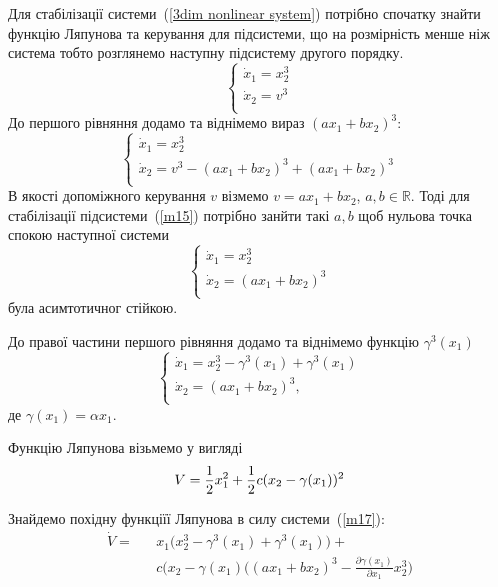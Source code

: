 \documentclass{article}
\begin{document}
Для стабілізації системи~(\ref{3dim nonlinear system}) потрібно спочатку знайти функцію Ляпунова
та керування для підсистеми, що на розмірність менше ніж система  тобто розглянемо 
наступну підсистему другого порядку. 
\begin{equation} \label{2dim nonlinear system}
    \begin{cases}
    \dot x_1 = x_2^3\\
    \dot x_2 = v^3\\
    \end{cases}
\end{equation}
До першого рівняння додамо та віднімемо вираз $(ax_1+bx_2)^3$:
\begin{equation}\label{m15}
    \begin{cases}
    \dot x_1 = x_{2}^3 \\
    \dot x_2 = v^3 - (ax_1+bx_2)^3 +(ax_1+bx_2)^3 \\
    \end{cases}
\end{equation}
В якості допоміжного керування $v$ візмемо $v=ax_1+bx_2$, $a,b \in \mathbb{R}$. Тоді
для стабілізації підсистеми~(\ref{m15}) потрібно занйти такі  $a,b$ щоб нульова точка спокою 
наступної системи
\begin{equation}\label{2dim nonlinear system2}
    \begin{cases}
    \dot x_1 =x_{2}^3 \\
    \dot x_2 =(ax_1+bx_2)^3 \\
    \end{cases}
\end{equation}
була асимтотичног стійкою.


До правої частини першого рівняння додамо та віднімемо функцію $\gamma^3(x_1)$ 
\begin{equation} \label{m17}
    \begin{cases}
    \dot x_1 =x_{2}^3 -\gamma^3(x_1)+\gamma^3(x_1) \\
    \dot x_2 = (ax_1+bx_2)^3,\\
    \end{cases}
\end{equation}
де $\gamma(x_1) = \alpha x_1$.

Функцію Ляпунова візьмемо у вигляді  
\begin{equation}
    V = \frac{1}{2}x_{1}^2 +\frac{1}{2}c(x_2 - \gamma(x_1) )^2\\
\end{equation}

Знайдемо похідну функціїї Ляпунова в силу системи~(\ref{m17}):
\begin{eqnarray}
    \dot V =&& x_1 \Big (x_2^3 - \gamma^3(x_1)+\gamma^3(x_1) \Big) +\nonumber \\
    &&c(x_2 - \gamma(x_1)
    \Big((ax_1+bx_2)^3-\frac{\partial \gamma(x_1)}{\partial x_1}x_2^3 \Big)
\end{eqnarray}
\end{document}
